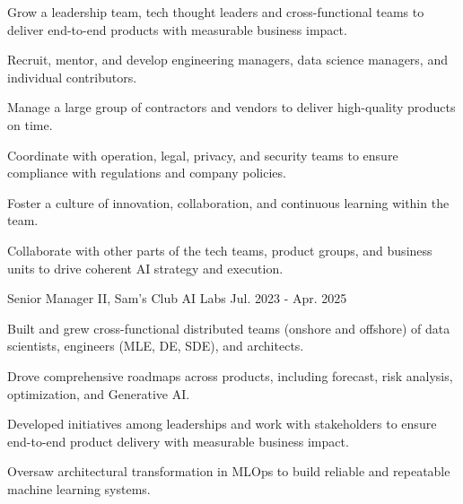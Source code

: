 \begin{cventries}
{\begin{cvitems}
\begin{cvitems}
          \end{cvitems}
        \item {Grow a leadership team, tech thought leaders and cross-functional teams to deliver end-to-end products with measurable business impact.}
          \vspace{4mm}
          \begin{cvitems}
            \item {Recruit, mentor, and develop engineering managers, data science managers, and individual contributors.}
            \item {Manage a large group of contractors and vendors to deliver high-quality products on time.}
            \item {Coordinate with operation, legal, privacy, and security teams to ensure compliance with regulations and company policies.}
            \item {Foster a culture of innovation, collaboration, and continuous learning within the team.}
          \end{cvitems}
        \item {Collaborate with other parts of the tech teams, product groups, and business units to drive coherent AI strategy and execution.}
			\end{cvitems}
		}

	\cventry
		{Senior Manager II, Sam's Club AI Labs} %
		{} %
		{} %
		{Jul. 2023 - Apr. 2025} %
		{
			\begin{cvitems} %
				\item {Built and grew cross-functional distributed teams (onshore and offshore) 
				of data scientists, engineers (MLE, DE, SDE), and architects.}
				\item {Drove comprehensive roadmaps across products, including forecast, risk 
				analysis, optimization, and Generative AI.}
				\item {Developed initiatives among leaderships and work with stakeholders to ensure 
				end-to-end product delivery with measurable business impact.}
				\item {Oversaw architectural transformation in MLOps to build reliable and 
				repeatable machine learning systems.}
			\end{cvitems}
		}


\end{cventries}

